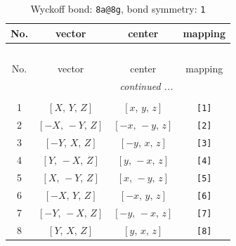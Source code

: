 \documentclass[fleqn,8pt]{jsarticle}
\begin{document}
\begin{longtable}{cccc}
\caption{Wyckoff bond: {\tt 8a@8g}, bond symmetry: {\tt 1}}
 \\
 \hline \hline
No. & vector & center & mapping \\ \hline \endfirsthead

\multicolumn{3}{l}{\tablename\ \thetable{}} \\
 \hline \hline
No. & vector & center & mapping \\ \hline \endhead

 \hline \hline
\multicolumn{3}{r}{\footnotesize\it continued ...} \\ \endfoot

 \hline \hline
\multicolumn{3}{r}{} \\ \endlastfoot

1 & $\left[ X,\, Y,\, Z \right]$ & $\left[ x,\, y,\, z \right]$ & {\tt [1]} \\ \hline
2 & $\left[ - X,\, - Y,\, Z \right]$ & $\left[ - x,\, - y,\, z \right]$ & {\tt [2]} \\ \hline
3 & $\left[ - Y,\, X,\, Z \right]$ & $\left[ - y,\, x,\, z \right]$ & {\tt [3]} \\ \hline
4 & $\left[ Y,\, - X,\, Z \right]$ & $\left[ y,\, - x,\, z \right]$ & {\tt [4]} \\ \hline
5 & $\left[ X,\, - Y,\, Z \right]$ & $\left[ x,\, - y,\, z \right]$ & {\tt [5]} \\ \hline
6 & $\left[ - X,\, Y,\, Z \right]$ & $\left[ - x,\, y,\, z \right]$ & {\tt [6]} \\ \hline
7 & $\left[ - Y,\, - X,\, Z \right]$ & $\left[ - y,\, - x,\, z \right]$ & {\tt [7]} \\ \hline
8 & $\left[ Y,\, X,\, Z \right]$ & $\left[ y,\, x,\, z \right]$ & {\tt [8]} \\
\end{longtable}
\end{document}
